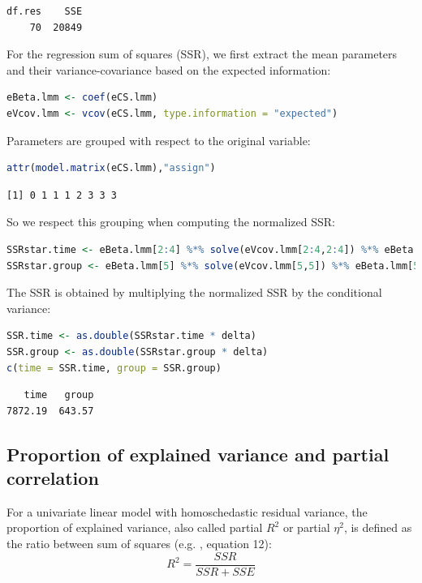 \documentclass[12pt]{article}
\begin{document}
\label{}
\begin{verbatim}
df.res    SSE 
    70  20849
\end{verbatim}


For the regression sum of squares (SSR), we first extract the mean
parameters and their variance-covariance based on the expected
information:
\begin{lstlisting}[language=r,numbers=none]
eBeta.lmm <- coef(eCS.lmm)
eVcov.lmm <- vcov(eCS.lmm, type.information = "expected")
\end{lstlisting}

Parameters are grouped with respect to the original variable:
\begin{lstlisting}[language=r,numbers=none]
attr(model.matrix(eCS.lmm),"assign")
\end{lstlisting}

\label{}
\begin{verbatim}
[1] 0 1 1 1 2 3 3 3
\end{verbatim}


\bigskip

So we respect this grouping when computing the normalized SSR: 
\begin{lstlisting}[language=r,numbers=none]
SSRstar.time <- eBeta.lmm[2:4] %*% solve(eVcov.lmm[2:4,2:4]) %*% eBeta.lmm[2:4] 
SSRstar.group <- eBeta.lmm[5] %*% solve(eVcov.lmm[5,5]) %*% eBeta.lmm[5] 
\end{lstlisting}
The SSR is obtained by multiplying the normalized SSR by the
conditional variance:
\begin{lstlisting}[language=r,numbers=none]
SSR.time <- as.double(SSRstar.time * delta)
SSR.group <- as.double(SSRstar.group * delta)
c(time = SSR.time, group = SSR.group)
\end{lstlisting}
\label{}
\begin{verbatim}
   time   group 
7872.19  643.57
\end{verbatim}
\subsection{Proportion of explained variance and partial correlation}
\label{sec:org6d19fd6}

For a univariate linear model with homoschedastic residual variance,
the proportion of explained variance, also called partial \(R^2\) or
partial \(\eta^2\), is defined as the ratio between sum of squares
(e.g. \cite{lakens2013calculating}, equation 12):
\[ R^2=\frac{SSR}{SSR + SSE} \]
\end{document}

